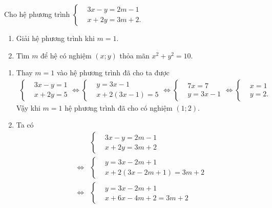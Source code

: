 \begin{ex}%
	Cho hệ phương trình $\left\{\begin{aligned}&3x-y=2m-1 \\&x+2y=3m+2.\end{aligned}\right.$
	\begin{enumerate}
		\item Giải hệ phương trình khi $m=1$.
		\item Tìm $m$ để hệ có nghiệm $(x;y)$ thỏa mãn $x^2+y^2=10$.
	\end{enumerate}
	\loigiai
	{
		\begin{enumerate}
			\item Thay $m=1$ vào hệ phương trình đã cho ta được
			\begin{eqnarray*}
			 \left\{\begin{aligned}&3x-y=1 \\&x+2y=5\end{aligned}\right. \Leftrightarrow \left\{\begin{aligned}&y=3x-1 \\&x+2(3x-1)=5\end{aligned}\right. \Leftrightarrow \left\{\begin{aligned}&7x=7 \\&y=3x-1\end{aligned}\right. \Leftrightarrow \left\{\begin{aligned}&x=1 \\&y=2.\end{aligned}\right.
			\end{eqnarray*}
			Vậy khi $m=1$ hệ phương trình đã cho có nghiệm $(1;2)$.
			\item Ta có
			\begin{eqnarray*}
			 && \left\{\begin{aligned}&3x-y=2m-1 \\&x+2y=3m+2\end{aligned}\right. \\
			 &\Leftrightarrow & \left\{\begin{aligned}&y=3x-2m+1 \\&x+2(3x-2m+1)=3m+2\end{aligned}\right. \\
			 &\Leftrightarrow &\left\{\begin{aligned}&y=3x-2m+1 \\&x+6x-4m+2=3m+2\end{aligned}\right.\\

\end{eqnarray*}
\end{enumerate}}
\end{ex}
